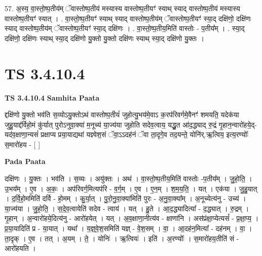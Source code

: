 \documentclass[17pt]{extarticle}
\begin{document}
57. अ॒स्य॒ वा॒स्तो॒ष्प॒तीय॑म् ॅवास्तोष्प॒तीय॑ मस्यास्य वास्तोष्प॒तीयꣳ॑ स्याथ् स्याद् वास्तोष्प॒तीय॑ मस्यास्य वास्तोष्प॒तीयꣳ॑ स्यात् । . वा॒स्तो॒ष्प॒तीयꣳ॑ स्याथ् स्याद् वास्तोष्प॒तीय॑म् ॅवास्तोष्प॒तीयꣳ॑ स्या॒द् दक्षि॑णो॒ दक्षि॑णः स्याद् वास्तोष्प॒तीय॑म् ॅवास्तोष्प॒तीयꣳ॑ स्या॒द् दक्षि॑णः । . वा॒स्तो॒ष्प॒तीय॒मिति॑ वास्तोः - प॒तीय᳚म् । . स्या॒द् दक्षि॑णो॒ दक्षि॑णः स्याथ् स्या॒द् दक्षि॑णो यु॒क्तो यु॒क्तो दक्षि॑णः स्याथ् स्या॒द् दक्षि॑णो यु॒क्तः । \newline
\pagebreak
{}

\section{ TS 3.4.10.4 }

\textbf{TS 3.4.10.4 } \newline
\textbf{Samhita Paata} \newline

द्दक्षि॑णो यु॒क्तो भव॑ति स॒व्योऽयु॒क्तोऽथ॑ वास्तोष्प॒तीयं॑ जुहोत्यु॒भय॑मे॒वाऽ क॒रप॑रिवर्गमे॒वैनꣳ॑ शमयति॒ यदेक॑या जुहु॒याद्द॑र्विहो॒मं कु॑र्यात् पुरोऽनुवा॒क्या॑ म॒नूच्य॑ या॒ज्य॑या जुहोति सदेव॒त्वाय॒ यद्धु॒त आ॑द॒द्ध्याद् रु॒द्रं गृ॒हान॒न्वारो॑हये॒द्-यद॑व॒क्षाणा॒न्यसं॑ प्रक्षाप्य प्रया॒याद्यथा॑ यज्ञ्वेश॒सं ॅवा॒ऽऽदह॑नं ॅवा ता॒दृगे॒व तद॒यन्ते॒ योनि॑र्.ऋ॒त्विय॒ इत्य॒रण्योः᳚ स॒मारो॑हय - [  ] \newline

\textbf{Pada Paata} \newline

दक्षि॑णः । यु॒क्तः । भव॑ति । स॒व्यः । अयु॑क्तः । अथ॑ । वा॒स्तो॒ष्प॒तीय॒मिति॑ वास्तोः -प॒तीय᳚म् । जु॒हो॒ति॒ । उ॒भय᳚म् । ए॒व । अ॒कः॒ । अप॑रिवर्ग॒मित्यप॑रि - व॒र्ग॒म् । ए॒व । ए॒न॒म् । श॒म॒य॒ति॒ । यत् । एक॑या । जु॒हु॒यात् । द॒र्वि॒हो॒ममिति॑ दर्वि - हो॒मम् । कु॒र्या॒त् । पु॒रो॒नु॒वा॒क्या॑मिति॑ पुरः - अ॒नु॒वा॒क्या᳚म् । अ॒नूच्येत्य॑नु - उच्य॑ । या॒ज्य॑या । जु॒हो॒ति॒ । स॒दे॒व॒त्वायेति॑ सदेव - त्वाय॑ । यत् । हु॒ते । आ॒द॒द्ध्यादित्या᳚ - द॒द्ध्यात् । रु॒द्रम् । गृ॒हान् । अ॒न्वारो॑हये॒दित्य॑नु - आरो॑हयेत् । यत् । अ॒व॒क्षाणा॒नीत्य॑व - क्षाणा॑नि । अस॑प्रंक्षा॒प्येत्यसं᳚ - प्र॒क्षा॒प्य॒ । प्र॒या॒यादिति॑ प्र - या॒यात् । यथा᳚ । य॒ज्ञ्॒वे॒श॒समिति॑ यज्ञ् - वे॒श॒सम् । वा॒ । आ॒दह॑न॒मित्या᳚ - दह॑नम् । वा॒ । ता॒दृक् । ए॒व । तत् । अ॒यम् । ते॒ । योनिः॑ । ऋ॒त्वियः॑ । इति॑ । अ॒रण्योः᳚ । स॒मारो॑हय॒तीति॑ सं - आरो॑हयति ।  \newline
\end{document}
